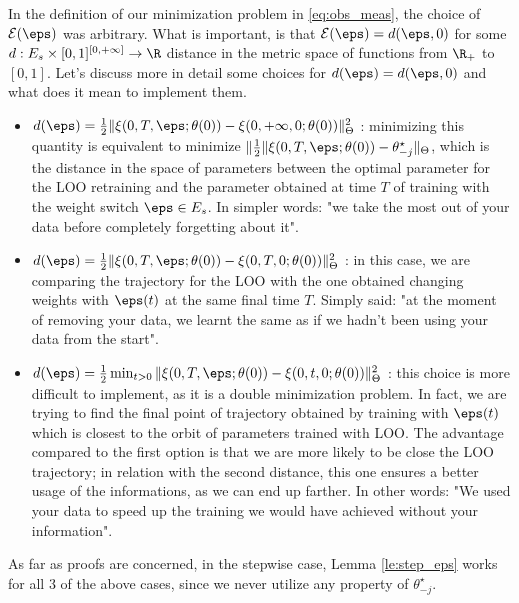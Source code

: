 In the definition of our minimization problem in \ref{eq:obs_meas}, the choice of $\mathcal{E}(\eps)$ was arbitrary.
What is important, is that $\mathcal{E}(\eps)=d(\eps,0)$ for some $d:E_s\times [0,1]^{[0,+\infty]} \to \R$ distance in the metric space of functions from $\R_+$ to $[0,1]$.
Let's discuss more in detail some choices for $d(\eps)=d(\eps,0)$ and what does it mean to implement them.
\begin{itemize}
  \item $d(\eps) = \frac12 \|\xi(0,T,\eps;\theta(0))-\xi(0,+\infty,0;\theta(0))\|^2_\Theta$ : 
  minimizing this quantity is equi\-valent to minimize $\|\frac{1}{2}\|\xi(0,T,\eps;\theta(0))-\theta^\star_{-j}\|_\Theta$, which is the distance in the space of parameters between the optimal
  parameter for the LOO retraining and the parameter obtained at time $T$ of training with the weight switch $\eps\in E_s$.
  In simpler words: "we take the most out of your data before completely forgetting about it".
  
  \item $d(\eps) = \frac12 \|\xi(0,T,\eps;\theta(0))-\xi(0,T,0;\theta(0))\|^2_\Theta$ : 
  in this case, we are comparing the trajectory for the LOO with the one obtained changing weights with $\eps(t)$ at the same final time $T$.
  Simply said: "at the moment of removing your data, we learnt the same as if we hadn't been using your data from the start".
  
  \item $d(\eps) = \frac12 \min_{t>0}\|\xi(0,T,\eps;\theta(0))-\xi(0,t,0;\theta(0))\|^2_\Theta$ : 
  this choice is more difficult to implement, as it is a double minimization problem. 
  In fact, we are trying to find the final point of trajectory obtained by training with $\eps(t)$ which is closest to the orbit of parameters trained with LOO.
  The advantage compared to the first option is that we are more likely to be close the LOO trajectory; in relation with the second distance, this one ensures a better usage of the informations, as we can end up farther. 
  In other words: "We used your data to speed up the training we would have achieved without your information".  
\end{itemize} 
As far as proofs are concerned, in the stepwise case, Lemma \ref{le:step_eps} works for all 3 of the above cases, since we never utilize any property of $\theta^\star_{-j}$.

